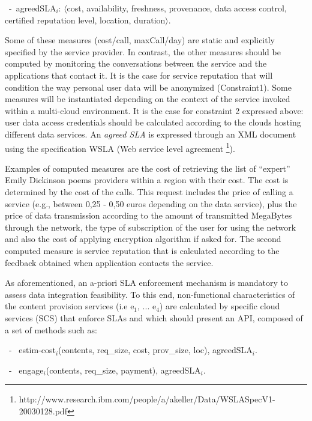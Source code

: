 
\begin{trivlist}\sf\footnotesize
\item[~-~agreedSLA$_i$:] $\langle$cost, availability, freshness, provenance, data access control, certified reputation level, location, duration$\rangle$. 
 \end{trivlist}
 
Some of these measures ({cost/call, maxCall/day}) are static and explicitly specified by the service provider. 
In contrast, the other measures should be computed by monitoring the conversations between the service and the applications that contact it.  It is the case for service reputation that will condition the way personal user data will be anonymized (Constraint1).  Some measures will be instantiated depending on the context of  the service invoked within a multi-cloud environment. It is the case for constraint 2 expressed above:   user data access credentials should be calculated according to the clouds hosting different data services.
An \textit{agreed SLA} is expressed through an  XML document using the specification WSLA (Web service level agreement \footnote{\footnotesize http://www.research.ibm.com/people/a/akeller/\-Data/WSLASpecV1-20030128.pdf}).

Examples of computed measures are the cost of retrieving the list of ``expert'' Emily Dickinson poems providers within a region with their cost. 
The cost is determined by the  cost of the calls. 
This request  includes the price of calling a service (e.g.,  between 0,25 - 0,50 euros depending on the data service), plus the price of data transmission according to the amount of transmitted MegaBytes through the network, the type of subscription of the user for using the network and also the cost of applying encryption algorithm if asked for. The second computed measure is service reputation that is calculated according to the feedback obtained when application contacts the service.




As aforementioned, an a-priori SLA enforcement mechanism is mandatory to assess data integration feasibility.
To this end, non-functional characteristics of the content provision services ({i.e e$_1$, ... e$_4$}) are calculated by specific cloud services (SCS) that enforce SLAs  and which should present an API, composed of a set of methods such as:

\color{green}
\begin{trivlist}\sf\footnotesize
\item[~-~]estim-cost$_i$(contents, req\_size, cost, prov\_size, loc), 
agreedSLA$_i$.

\item[~-~]engage$_i$(contents, req\_size, payment), agreedSLA$_i$.
\end{trivlist}

